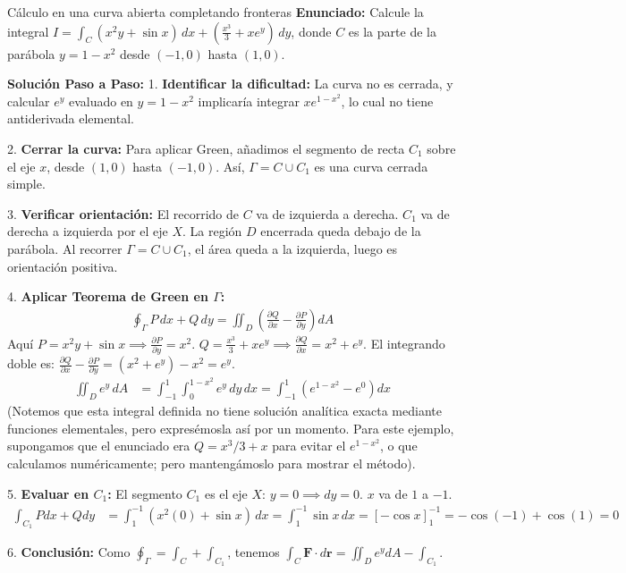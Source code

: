 \documentclass[11pt,a4paper]{article}
\begin{document}
\begin{ejerciciobox}{Cálculo en una curva abierta completando fronteras}
\textbf{Enunciado:} Calcule la integral $I = \int_C (x^2 y + \sin x) \, dx + \left( \frac{x^3}{3} + x e^y \right) \, dy$, donde $C$ es la parte de la parábola $y = 1 - x^2$ desde $(-1, 0)$ hasta $(1, 0)$.

\textbf{Solución Paso a Paso:}
1. \textbf{Identificar la dificultad:} La curva no es cerrada, y calcular $e^y$ evaluado en $y=1-x^2$ implicaría integrar $x e^{1-x^2}$, lo cual no tiene antiderivada elemental.

2. \textbf{Cerrar la curva:} Para aplicar Green, añadimos el segmento de recta $C_1$ sobre el eje $x$, desde $(1, 0)$ hasta $(-1, 0)$. Así, $\Gamma = C \cup C_1$ es una curva cerrada simple.

3. \textbf{Verificar orientación:} El recorrido de $C$ va de izquierda a derecha. $C_1$ va de derecha a izquierda por el eje $X$. La región $D$ encerrada queda debajo de la parábola. Al recorrer $\Gamma = C \cup C_1$, el área queda a la izquierda, luego es orientación positiva.

4. \textbf{Aplicar Teorema de Green en $\Gamma$:}
\begin{align*}
\oint_\Gamma P \, dx + Q \, dy = \iint_D \left( \frac{\partial Q}{\partial x} - \frac{\partial P}{\partial y} \right) dA
\end{align*}
Aquí $P = x^2 y + \sin x \implies \frac{\partial P}{\partial y} = x^2$.
$Q = \frac{x^3}{3} + x e^y \implies \frac{\partial Q}{\partial x} = x^2 + e^y$.
El integrando doble es: $\frac{\partial Q}{\partial x} - \frac{\partial P}{\partial y} = (x^2 + e^y) - x^2 = e^y$.
\begin{align*}
\iint_D e^y \, dA &= \int_{-1}^1 \int_0^{1-x^2} e^y \, dy \, dx = \int_{-1}^1 (e^{1-x^2} - e^0) dx
\end{align*}
(Notemos que esta integral definida no tiene solución analítica exacta mediante funciones elementales, pero expresémosla así por un momento. Para este ejemplo, supongamos que el enunciado era $Q = x^3/3 + x$ para evitar el $e^{1-x^2}$, o que calculamos numéricamente; pero mantengámoslo para mostrar el método).

5. \textbf{Evaluar en $C_1$:}
El segmento $C_1$ es el eje $X$: $y=0 \implies dy=0$. $x$ va de $1$ a $-1$.
\begin{align*}
\int_{C_1} P dx + Q dy &= \int_1^{-1} (x^2(0) + \sin x) \, dx = \int_1^{-1} \sin x \, dx = [-\cos x]_1^{-1} = -\cos(-1) + \cos(1) = 0
\end{align*}

6. \textbf{Conclusión:}
Como $\oint_\Gamma = \int_C + \int_{C_1}$, tenemos $\int_C \mathbf{F}\cdot d\mathbf{r} = \iint_D e^y dA - \int_{C_1}$.
\end{ejerciciobox}
\end{document}
